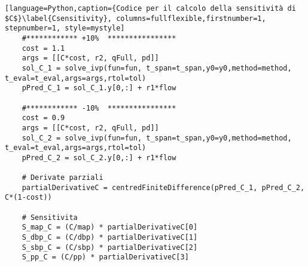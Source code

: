 \begin{lstlisting}[language=Python,caption={Codice per il calcolo della sensitività di $C$}\label{Csensitivity}, columns=fullflexible,firstnumber=1, stepnumber=1, style=mystyle]
    #************ +10%  ****************
    cost = 1.1
    args = [[C*cost, r2, qFull, pd]]
    sol_C_1 = solve_ivp(fun=fun, t_span=t_span,y0=y0,method=method, t_eval=t_eval,args=args,rtol=tol)
    pPred_C_1 = sol_C_1.y[0,:] + r1*flow
    
    #************ -10%  ****************
    cost = 0.9
    args = [[C*cost, r2, qFull, pd]]
    sol_C_2 = solve_ivp(fun=fun, t_span=t_span,y0=y0,method=method, t_eval=t_eval,args=args,rtol=tol)
    pPred_C_2 = sol_C_2.y[0,:] + r1*flow
    
    # Derivate parziali
    partialDerivativeC = centredFiniteDifference(pPred_C_1, pPred_C_2, C*(1-cost))
    
    # Sensitivita
    S_map_C = (C/map) * partialDerivativeC[0]
    S_dbp_C = (C/dbp) * partialDerivativeC[1]
    S_sbp_C = (C/sbp) * partialDerivativeC[2]
    S_pp_C = (C/pp) * partialDerivativeC[3]
\end{lstlisting}